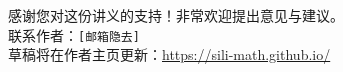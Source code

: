 \thispagestyle{empty}
\vspace*{\fill}
\begin{center}
\small
\begin{minipage}{0.78\textwidth}
\centering
感谢您对这份讲义的支持！非常欢迎提出意见与建议。\\
联系作者：\texttt{[邮箱隐去]}\\
草稿将在作者主页更新：\url{https://sili-math.github.io/}
\end{minipage}
\end{center}
\vspace*{\fill}
\clearpage
